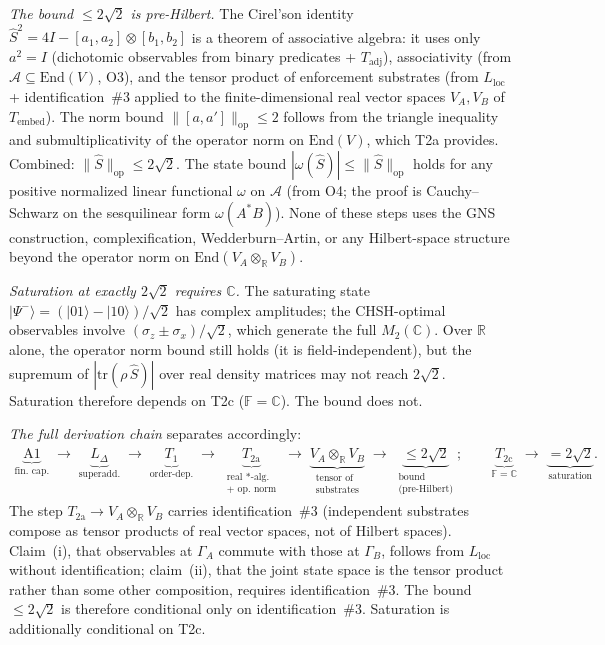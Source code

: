 \documentclass[11pt]{article}
\theoremstyle{remark}
\begin{document}
\smallskip\noindent\textit{The bound $\le 2\sqrt{2}$ is pre-Hilbert.}  The Cirel'son identity $\hat{S}^2 = 4I - [a_1,a_2]\otimes[b_1,b_2]$ is a theorem of associative algebra: it uses only $a^2 = I$ (dichotomic observables from binary predicates + $T_{\mathrm{adj}}$), associativity (from $\mathcal{A} \subseteq \mathrm{End}(V)$, O3), and the tensor product of enforcement substrates (from $L_{\mathrm{loc}}$ + identification~\#3 applied to the finite-dimensional real vector spaces $V_A, V_B$ of $T_{\mathrm{embed}}$).  The norm bound $\|[a,a']\|_{\mathrm{op}} \le 2$ follows from the triangle inequality and submultiplicativity of the operator norm on $\mathrm{End}(V)$, which T2a provides.  Combined: $\|\hat{S}\|_{\mathrm{op}} \le 2\sqrt{2}$.  The state bound $|\omega(\hat{S})| \le \|\hat{S}\|_{\mathrm{op}}$ holds for any positive normalized linear functional $\omega$ on $\mathcal{A}$ (from O4; the proof is Cauchy--Schwarz on the sesquilinear form $\omega(A^*B)$).  None of these steps uses the GNS construction, complexification, Wedderburn--Artin, or any Hilbert-space structure beyond the operator norm on $\mathrm{End}(V_A \otimes_\mathbb{R} V_B)$.

\smallskip\noindent\textit{Saturation at exactly $2\sqrt{2}$ requires $\mathbb{C}$.}  The saturating state $|\Psi^-\rangle = (|01\rangle - |10\rangle)/\sqrt{2}$ has complex amplitudes; the CHSH-optimal observables involve $(\sigma_z \pm \sigma_x)/\sqrt{2}$, which generate the full $M_2(\mathbb{C})$.  Over $\mathbb{R}$ alone, the operator norm bound still holds (it is field-independent), but the supremum of $|\mathrm{tr}(\rho\,\hat{S})|$ over real density matrices may not reach $2\sqrt{2}$.  Saturation therefore depends on T2c ($\mathbb{F} = \mathbb{C}$).  The bound does not.

\smallskip\noindent\textit{The full derivation chain} separates accordingly:
\begin{gather*}
\underbrace{\mathrm{A1}}_{\text{fin.\ cap.}} \;\to\; \underbrace{L_\Delta}_{\text{superadd.}} \;\to\; \underbrace{T_1}_{\text{order-dep.}} \;\to\; \underbrace{T_{2\mathrm{a}}}_{\substack{\text{real $*$-alg.}\\\text{+ op.\ norm}}} \;\to\; \underbrace{V_A \otimes_\mathbb{R} V_B}_{\substack{\text{tensor of}\\\text{substrates}}} \;\to\; \underbrace{\le 2\sqrt{2}}_{\substack{\text{bound}\\\text{(pre-Hilbert)}}};
\qquad
\underbrace{T_{2\mathrm{c}}}_{\mathbb{F}=\mathbb{C}} \;\to\; \underbrace{= 2\sqrt{2}}_{\text{saturation}}.
\end{gather*}
The step $T_{2\mathrm{a}} \to V_A \otimes_\mathbb{R} V_B$ carries identification~\#3 (independent substrates compose as tensor products of real vector spaces, not of Hilbert spaces).  Claim~(i), that observables at $\Gamma_A$ commute with those at $\Gamma_B$, follows from $L_{\mathrm{loc}}$ without identification; claim~(ii), that the joint state space is the tensor product rather than some other composition, requires identification~\#3.  The bound $\le 2\sqrt{2}$ is therefore conditional only on identification~\#3.  Saturation is additionally conditional on T2c.
\end{document}
